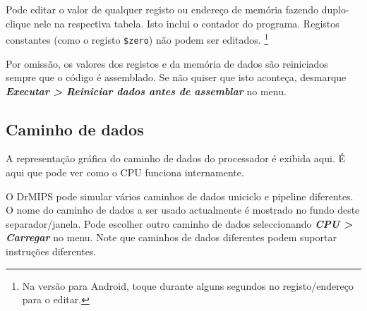 \documentclass[11pt,a4paper,twoside,titlepage]{article}
\newcommand{\menupath}[1]{\textbf{\emph{#1}}}
\begin{document}
Pode editar o valor de qualquer registo ou endereço de memória fazendo 
duplo-clique nele na respectiva tabela. Isto inclui o contador do programa.
Registos constantes (como o registo \verb+$zero+) não podem ser editados.
\footnote{Na versão para Android, toque durante alguns segundos no
registo/endereço para o editar.}

Por omissão, os valores dos registos e da memória de dados são reiniciados
sempre que o código é assemblado.
Se não quiser que isto aconteça, desmarque 
\menupath{Executar > Reiniciar dados antes de assemblar} no menu.


\subsection{Caminho de dados}

A representação gráfica do caminho de dados do processador é exibida aqui.
É aqui que pode ver como o CPU funciona internamente.

O DrMIPS pode simular vários caminhos de dados uniciclo e pipeline diferentes.
O nome do caminho de dados a ser usado actualmente é mostrado no fundo deste
separador/janela. Pode escolher outro caminho de dados seleccionando
\menupath{CPU > Carregar} no menu.
Note que caminhos de dados diferentes podem suportar instruções diferentes.
\end{document}
